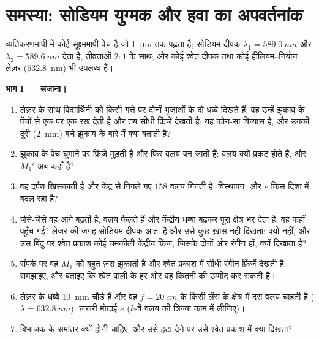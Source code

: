 \section{समस्या: सोडियम युग्मक और हवा का अपवर्तनांक}

\begin{problem}
\label{pb:b2:michelson:1}

व्यतिकरणमापी में कोई सूक्ष्ममापी पेंच है जो \qty{1}{\micro m} तक पढ़ता है;
सोडियम दीपक $\lambda_1 = \qty{589.0}{nm}$ और $\lambda_2 = \qty{589.6}{nm}$ देता है,
तीव्रताओं $2 : 1$ के साथ; और कोई श्वेत दीपक तथा कोई हीलियम--नियोन लेज़र (\qty{632.8}{nm}) भी
उपलब्ध हैं।

\medskip
\noindent\textbf{भाग I --- सजाना।}
\begin{enumerate}
  \item लेज़र के साथ विद्यार्थिनी को किसी गत्ते पर दोनों भुजाओं के दो
        धब्बे दिखते हैं; वह उन्हें झुकाव के पेंचों से एक पर एक रख देती है और तब
        सीधी फ्रिंजें देखती है: यह कौन-सा विन्यास है, और
        उनकी दूरी (\qty{2}{mm}) बचे झुकाव के बारे में क्या बताती है?
  \item झुकाव के पेंच घुमाने पर फ्रिंजें मुड़ती हैं और फिर वलय बन
        जाती हैं: वलय क्यों प्रकट होते हैं, और $M_1'$ अब कहाँ है?
  \item वह दर्पण खिसकाती है और केंद्र से निगले गए $158$ वलय गिनती
        है: विस्थापन; और $e$ किस दिशा में बदल रहा है?
  \item जैसे-जैसे वह आगे बढ़ती है, वलय फैलते हैं और केंद्रीय धब्बा बढ़कर
        पूरा क्षेत्र भर देता है: वह कहाँ पहुँच गई? लेज़र की जगह सोडियम
        दीपक आता है और उसे कुछ ख़ास नहीं दिखता: क्यों नहीं, और
        उस बिंदु पर श्वेत प्रकाश कोई चमकीली केंद्रीय फ्रिंज, जिसके दोनों ओर रंगीन हों, क्यों दिखाता है?
  \item संपर्क पर वह $M_1$ को बहुत ज़रा झुकाती है और श्वेत
        प्रकाश में सीधी रंगीन फ्रिंजें देखती है: समझाइए, और बताइए कि श्वेत वाली के
        हर ओर वह कितनी की उम्मीद कर सकती है।
  \item लेज़र के धब्बे \qty{10}{mm} चौड़े हैं और वह $f = \qty{20}{cm}$ के किसी लेंस
        के क्षेत्र में दस वलय चाहती है ($\lambda = \qty{632.8}{nm}$):
        ज़रूरी मोटाई $e$ ($k$-वें वलय की त्रिज्या काम में लीजिए)।
  \item {} विभाजक के समांतर क्यों होनी चाहिए,
        और उसे हटा देने पर उसे श्वेत प्रकाश में क्या दिखता?
\end{enumerate}


\end{problem}
